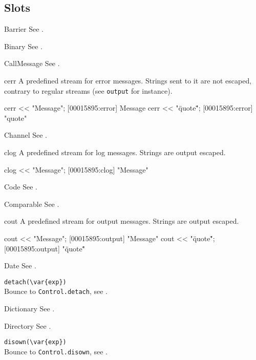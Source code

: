 \subsection{Slots}
\begin{urbiscriptapi}
\item[Barrier] See .
\item[Binary] See .
\item[CallMessage] See .

\item[cerr] A predefined stream for error messages.  Strings sent to
  it are not escaped, contrary to regular streams (see
  \lstinline|output| for instance).
\begin{urbiscript}
cerr << "Message";
[00015895:error] Message
cerr << "\"quote\"";
[00015895:error] "quote"
\end{urbiscript}

\item[Channel] See .

\item[clog] A predefined stream for log messages.  Strings are output
  escaped.
\begin{urbiscript}
clog << "Message";
[00015895:clog] "Message"
\end{urbiscript}

\item[Code] See .
\item[Comparable] See .

\item[cout] A predefined stream for output messages.  Strings are
  output escaped.
\begin{urbiscript}
cout << "Message";
[00015895:output] "Message"
cout << "\"quote\"";
[00015895:output] "\"quote\""
\end{urbiscript}

\item[Date] See .

\item \lstinline|detach(\var{exp})|\\
  Bounce to \lstinline|Control.detach|, see .

\item[Dictionary] See .
\item[Directory] See .

\item \lstinline|disown(\var{exp})|\\
  Bounce to \lstinline|Control.disown|, see .


\end{urbiscriptapi}
